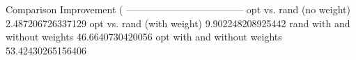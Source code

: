 Comparison	Improvement (%
------------------------------------
opt vs. rand (no weight)	2.487206726337129
opt vs. rand (with weight)	9.902248208925442
rand with and without weights	46.6640730420056
opt with and without weights	53.42430265156406

